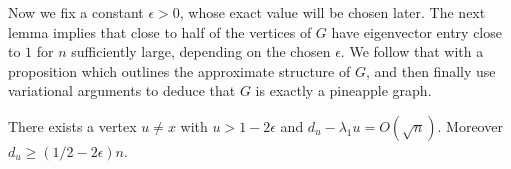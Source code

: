 Now we fix a constant $\epsilon > 0$, whose exact value will be 
chosen later.  The next lemma implies that close to half of the vertices of
$G$ have eigenvector entry close to $1$ for $n$ sufficiently large, 
depending on the chosen $\epsilon$.  We follow that with a proposition
which outlines the approximate structure of $G$, and then finally use
variational arguments to deduce that $G$ is exactly a pineapple graph.


\begin{lemma}\label{u good}
 There exists a vertex $u\not=x$ with $u > 1- 2 \epsilon$ and $d_u - \lambda_1 u = O(\sqrt{n})$.  Moreover $d_u \geq \left( 1/2 - 2\epsilon \right)n$.
\end{lemma}



